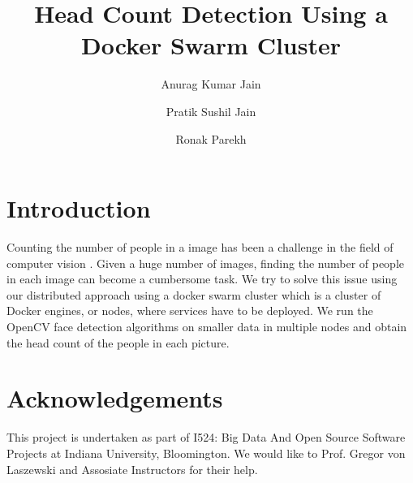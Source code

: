 \documentclass[9pt,twocolumn,twoside]{../../styles/osajnl}
\title{Head Count Detection Using a Docker Swarm Cluster}
\author[1]{Anurag Kumar Jain}
\author[1]{Pratik Sushil Jain}
\author[1]{Ronak Parekh}
\affil[1]{School of Informatics and Computing, Bloomington, IN 47408, U.S.A.}
\begin{document}
\maketitle

\section{Introduction}

Counting the number of people in a image has been a challenge in the
field of computer vision \cite{www-face-detection-wikipedia}. Given a
huge number of images, finding the number of people in each image can
become a cumbersome task. We try to solve this issue using our
distributed approach using a docker swarm cluster which is a cluster
of Docker \cite{www-docker-wikipedia} engines, or nodes, where
services have to be deployed. We run the OpenCV
\cite{www-opencv-wikipedia} face detection algorithms on smaller data
in multiple nodes and obtain the head count of the people in each
picture.

\section*{Acknowledgements}

This project is undertaken as part of I524: Big Data And Open Source
Software Projects at Indiana University, Bloomington. We would like to
Prof. Gregor von Laszewski and Assosiate Instructors for their help.



\end{document}
